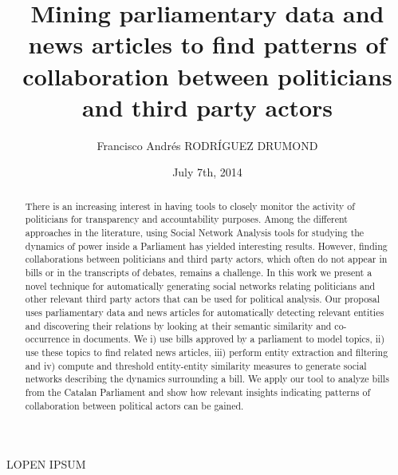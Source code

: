 \documentclass{report-DMKM}
\title{Mining parliamentary data and news articles \newline to find patterns of collaboration between politicians and third party actors}
\author{Francisco Andr\'es RODR\'IGUEZ DRUMOND}
\date{July 7th, 2014}
\begin{document}
\maketitle

\newpage
\begin{abstract}
There is an increasing interest in having tools to closely monitor the activity of politicians for transparency and accountability purposes. Among the different approaches in the literature, using Social Network Analysis tools for studying the dynamics of power inside a Parliament has yielded interesting results. However, finding collaborations between politicians and third party actors, which often do not appear in bills or in the transcripts of debates, remains a challenge. In this work we present a novel technique for automatically generating social networks relating politicians and other relevant third party actors that can be used for political analysis. Our proposal uses parliamentary data and news articles for automatically detecting relevant entities and discovering their relations by looking at their semantic similarity and co-occurrence in documents. We i) use bills approved by a parliament to model topics, ii) use these topics to find related news articles, iii) perform entity extraction and filtering and iv) compute and threshold entity-entity similarity measures to generate social networks describing the dynamics surrounding a bill. We apply our tool to analyze bills from the Catalan Parliament and show how relevant insights indicating patterns of collaboration between political actors can be gained.
\end{abstract}

\begin{resume}
LOPEN IPSUM
\end{resume}

\tabledesmatieres


\newpage

\newpage

\newpage

\newpage

\newpage

\newpage

\newpage

\newpage


 
\appendixECD
\end{document}
